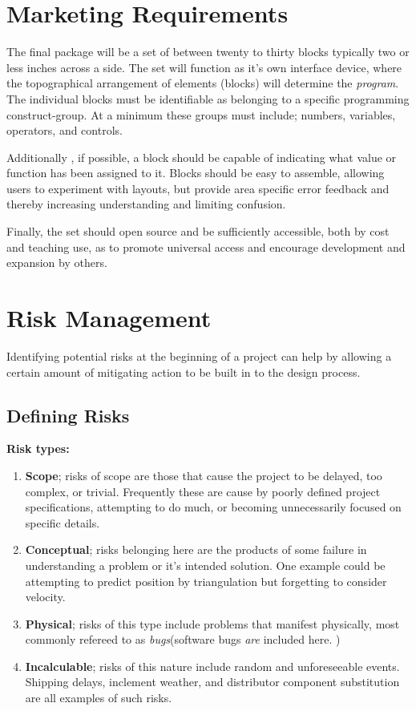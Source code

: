\section{Marketing Requirements}


The final package will be a set of between twenty to thirty blocks typically two or less inches across a side. The set will function as it's own interface device, where the topographical arrangement of elements (blocks) will determine the \textit{program}. The individual blocks must be identifiable as belonging to a specific programming construct-group. At a minimum these groups must include; numbers, variables, operators, and controls.

Additionally , if possible, a block should be capable of indicating what  value or function has been  assigned to it. Blocks should be easy to assemble,  allowing users to experiment with layouts, but provide area specific error feedback and thereby increasing understanding and limiting confusion. 

Finally, the set should open source and be sufficiently accessible, both by cost and teaching use, as to promote universal access and encourage development and expansion by others.



\section{Risk Management}
Identifying potential risks  at the beginning of a project can help by allowing a certain amount of mitigating action to be built in to the design process.
\subsection{Defining Risks} 
 
 \hspace{.35cm} \textbf{Risk types:}
 \begin{enumerate}
 \item \textbf{Scope}; risks of scope are those that cause the project to be delayed, too complex, or trivial. Frequently these are cause by poorly defined project specifications, attempting to do much, or becoming unnecessarily focused on specific details.
 \item \textbf{Conceptual}; risks belonging here are the products of some failure in understanding a problem or it's intended solution. One example could be  attempting to predict position by triangulation but forgetting to consider velocity. 
 \item \textbf{Physical}; risks of this type include problems that manifest physically, most commonly refereed to as \textit{bugs}(software bugs \textit{are} included here. )
 \item \textbf{Incalculable}; risks of this nature include random and unforeseeable events. Shipping delays, inclement weather, and distributor component substitution are all examples of such risks.
 \end{enumerate}
